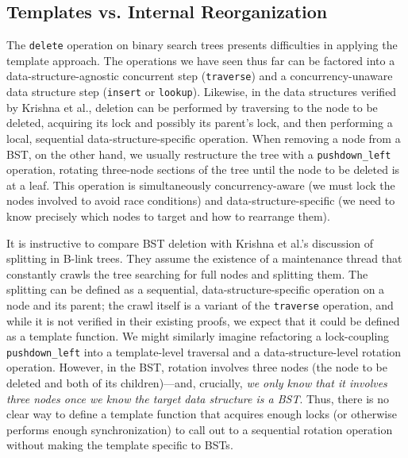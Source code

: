 \documentclass[a4paper,UKenglish,cleveref, autoref, thm-restate]{lipics-v2021}
\newcommand{\treerep}{\ensuremath{\mathsf{Node}}}
\begin{document}



\subsection{Templates vs. Internal Reorganization}
\label{internal_reorganize}
The \lstinline{delete} operation on binary search trees presents difficulties in applying the template approach. The operations we have seen thus far can be factored into a data-structure-agnostic concurrent step (\lstinline{traverse}) and a concurrency-unaware data structure step (\lstinline{insert} or \lstinline{lookup}). Likewise, in the data structures verified by Krishna et al., deletion can be performed by traversing to the node to be deleted, acquiring its lock and possibly its parent's lock, and then performing a local, sequential data-structure-specific operation. When removing a node from a BST, on the other hand, we usually restructure the tree with a \lstinline{pushdown_left} operation, %
rotating three-node sections of the tree until the node to be deleted is at a leaf. This operation is simultaneously concurrency-aware (we must lock the nodes involved to avoid race conditions) and data-structure-specific (we need to know precisely which nodes to target and how to rearrange them).

It is instructive to compare BST deletion with Krishna et al.'s discussion of splitting in B-link trees. They assume the existence of a maintenance thread that constantly crawls the tree searching for full nodes and splitting them. The splitting can be defined as a sequential, data-structure-specific operation on a node and its parent; the crawl itself is a variant of the \lstinline{traverse} operation, and while it is not verified in their existing proofs, we expect that it could be defined as a template function. We might similarly imagine refactoring a lock-coupling \lstinline{pushdown_left} into a template-level traversal and a data-structure-level rotation operation. However, in the BST, rotation involves three nodes (the node to be deleted and both of its children)---and, crucially, \emph{we only know that it involves three nodes once we know the target data structure is a BST}. Thus, there is no clear way to define a template function that acquires enough locks (or otherwise performs enough synchronization) to call out to a sequential rotation operation without making the template specific to BSTs.
\end{document}
